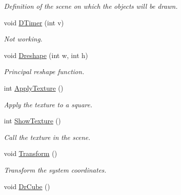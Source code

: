 \begin{DoxyCompactItemize}
\begin{DoxyCompactList}\small\item\em \-Definition of the scene on which the objects will be drawn. \end{DoxyCompactList}\item 
\hypertarget{classDraw_a3c4f3df21652856a8394a447d2afa61d}{void \hyperlink{classDraw_a3c4f3df21652856a8394a447d2afa61d}{\-D\-Timer} (int v)}\label{classDraw_a3c4f3df21652856a8394a447d2afa61d}

\begin{DoxyCompactList}\small\item\em \-Not working. \end{DoxyCompactList}\item 
\hypertarget{classDraw_a0cd7542f249d2cef85422d5ae63de96a}{void \hyperlink{classDraw_a0cd7542f249d2cef85422d5ae63de96a}{\-Dreshape} (int w, int h)}\label{classDraw_a0cd7542f249d2cef85422d5ae63de96a}

\begin{DoxyCompactList}\small\item\em \-Principal reshape function. \end{DoxyCompactList}\item 
\hypertarget{classDraw_a109d40d540116a12e8fe6b88dcd1ec89}{int \hyperlink{classDraw_a109d40d540116a12e8fe6b88dcd1ec89}{\-Apply\-Texture} ()}\label{classDraw_a109d40d540116a12e8fe6b88dcd1ec89}

\begin{DoxyCompactList}\small\item\em \-Apply the texture to a square. \end{DoxyCompactList}\item 
\hypertarget{classDraw_ab319e761c351a70537cda32d33f63098}{int \hyperlink{classDraw_ab319e761c351a70537cda32d33f63098}{\-Show\-Texture} ()}\label{classDraw_ab319e761c351a70537cda32d33f63098}

\begin{DoxyCompactList}\small\item\em \-Call the texture in the scene. \end{DoxyCompactList}\item 
\hypertarget{classDraw_a26cd1ca797b17da835a5d2050c6dda2f}{void \hyperlink{classDraw_a26cd1ca797b17da835a5d2050c6dda2f}{\-Transform} ()}\label{classDraw_a26cd1ca797b17da835a5d2050c6dda2f}

\begin{DoxyCompactList}\small\item\em \-Transform the system coordinates. \end{DoxyCompactList}\item 
\hypertarget{classDraw_ae391a0fc7ddb11d90732dd74249f5fe7}{void \hyperlink{classDraw_ae391a0fc7ddb11d90732dd74249f5fe7}{\-Dr\-Cube} ()}\label{classDraw_ae391a0fc7ddb11d90732dd74249f5fe7}


\end{DoxyCompactItemize}
